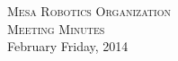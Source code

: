 \begin{center}{\LARGE\scshape Mesa Robotics Organization}\\[0.2cm]
{\Large\scshape Meeting Minutes}\\[0.2cm]
{\large February Friday, 2014}
\end{center}